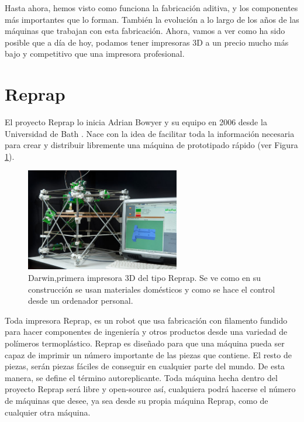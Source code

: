 Hasta ahora, hemos visto como funciona la fabricación aditiva, y los componentes más importantes que lo forman. También la evolución a lo largo de los años de las máquinas que trabajan con esta fabricación. Ahora, vamos a ver como ha sido posible que a día de hoy, podamos tener impresoras 3D a un precio mucho más bajo y competitivo que una impresora profesional.

\section{Reprap}
El proyecto Reprap lo inicia Adrian Bowyer y su equipo en 2006 desde la Universidad de Bath \cite{jones2011reprap}. Nace con la idea de facilitar toda la información necesaria para crear y distribuir libremente una máquina de prototipado rápido (ver Figura \ref{fig:estado_darwin}).

\begin{figure}[H]
    \centering
    \includegraphics[width=0.6\textwidth]{images/darwin.jpg}
    \caption[Darwin,primera impresora 3D del tipo Reprap]{Darwin,primera impresora 3D del tipo Reprap. Se ve como en su construcción se usan materiales domésticos y como se hace el control desde un ordenador personal.}
    \label{fig:estado_darwin}
\end{figure}

Toda impresora Reprap, es un robot que usa fabricación con filamento fundido para hacer componentes de ingeniería y otros productos desde una variedad de polímeros termoplástico. Reprap es diseñado para que una máquina pueda ser capaz de imprimir un número importante de las piezas que contiene. El resto de piezas, serán piezas fáciles de conseguir en cualquier parte del mundo. De esta manera, se define el término autoreplicante. Toda máquina hecha dentro del proyecto Reprap será libre y open-source así, cualquiera podrá hacerse el número de máquinas que desee, ya sea desde su propia máquina Reprap, como de cualquier otra máquina.\\

